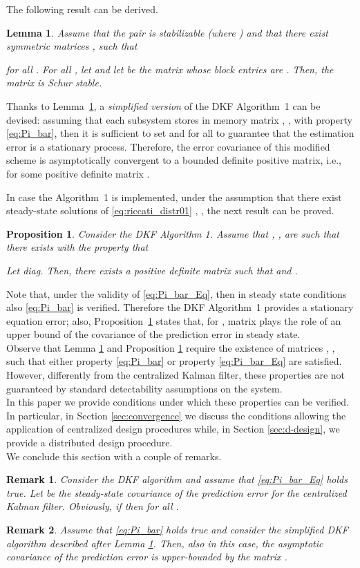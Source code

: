 \documentclass[journal,10pt,draftcls,onecolumn]{IEEEtran}
\newtheorem{remark}{Remark}
\newtheorem{lemma}{Lemma}
\newtheorem{proposition}{Proposition}
\begin{document}
The following result can be derived.
\begin{lemma}
\label{lemma:stability}
Assume that the pair  is stabilizable (where ) and that there exist symmetric matrices ,  such that

for all . For all , let
 and let  be the matrix whose block entries are . Then, the matrix  is Schur stable.\hfill{}
\end{lemma}
Thanks to Lemma~\ref{lemma:stability}, a \emph{simplified version} of the DKF Algorithm~1 can be devised: assuming that each subsystem  stores in memory matrix , , with property \eqref{eq:Pi_bar}, then it is sufficient to set  and  for all  to guarantee that the estimation error  is a stationary process. Therefore, the error covariance of this modified scheme is asymptotically convergent to a bounded definite positive matrix, i.e.,  for some positive definite matrix .

In case the Algorithm~1 is implemented, under the assumption that there exist steady-state solutions of \eqref{eq:riccati_distr01} , , the next result can be proved.
\begin{proposition}\label{prop:stability}
Consider the DKF Algorithm 1. Assume that , , are such that there exists  with the property that

Let diag. Then, there exists a positive definite matrix  such that  and . \hfill{}
\end{proposition}
Note that, under the validity of \eqref{eq:Pi_bar_Eq}, then in steady state conditions also \eqref{eq:Pi_bar} is verified. Therefore the DKF Algorithm~1 provides a stationary equation error; also, Proposition~\ref{prop:stability} states that, for , matrix  plays the role of an upper bound of the covariance of the prediction error  in steady state.\\
Observe that Lemma \ref{lemma:stability} and Proposition \ref{prop:stability} require the existence of matrices , , such that either property \eqref{eq:Pi_bar} or property \eqref{eq:Pi_bar_Eq} are satisfied. However, differently from the centralized Kalman filter, these properties are not guaranteed by standard detectability assumptions on the system.\\
In this paper we provide conditions under which these properties can be verified. In particular, in Section \ref{sec:convergence} we discuss the conditions allowing the application of  centralized design procedures while, in Section \ref{sec:d-design}, we provide a distributed design procedure.\\
We conclude this section with a couple of remarks.
\begin{remark}
Consider the DKF algorithm and assume that \eqref{eq:Pi_bar_Eq} holds true.
Let  be the steady-state covariance of the prediction error for the centralized Kalman filter. Obviously, if  then   for all .
\end{remark}
\begin{remark}\label{rem:subopt_costant}
Assume that \eqref{eq:Pi_bar} holds true and consider the \emph{simplified DKF algorithm} described after Lemma \ref{lemma:stability}. Then, also in this case, the asymptotic covariance of the prediction error  is
upper-bounded by the matrix .
\end{remark}
\end{document}
